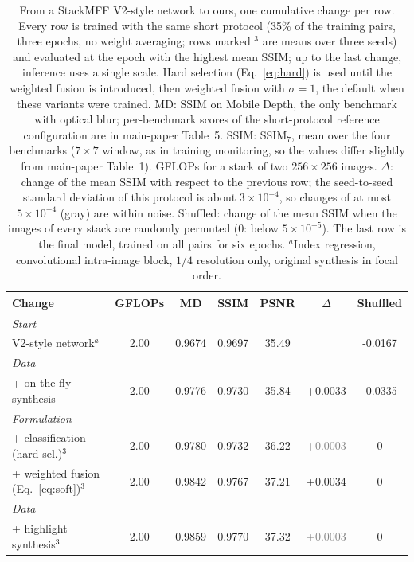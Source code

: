 \begin{table}[htbp]
\centering
\scriptsize
\setlength{\tabcolsep}{3pt}
\caption{From a StackMFF V2-style network to ours, one cumulative change per row. Every row is trained with the same short protocol (35\% of the training pairs, three epochs, no weight averaging; rows marked $^{3}$ are means over three seeds) and evaluated at the epoch with the highest mean SSIM; up to the last change, inference uses a single scale. Hard selection (Eq.~\eqref{eq:hard}) is used until the weighted fusion is introduced, then weighted fusion with $\sigma=1$, the default when these variants were trained. MD: SSIM on Mobile Depth, the only benchmark with optical blur; per-benchmark scores of the short-protocol reference configuration are in main-paper Table~5. SSIM: SSIM$_7$, mean over the four benchmarks ($7\times7$ window, as in training monitoring, so the values differ slightly from main-paper Table~1). GFLOPs for a stack of two $256\times256$ images. $\Delta$: change of the mean SSIM with respect to the previous row; the seed-to-seed standard deviation of this protocol is about $3\times10^{-4}$, so changes of at most $5\times10^{-4}$ (gray) are within noise. Shuffled: change of the mean SSIM when the images of every stack are randomly permuted ($0$: below $5\times10^{-5}$). The last row is the final model, trained on all pairs for six epochs. $^{a}$Index regression, convolutional intra-image block, $1/4$ resolution only, original synthesis in focal order.}
\label{tab:roadmap}
\begin{tabular}{lcccccc}
\toprule
Change & GFLOPs & MD & SSIM & PSNR & $\Delta$ & Shuffled \\
\midrule
\multicolumn{7}{l}{\textit{Start}} \\
V2-style network$^{a}$ & 2.00 & 0.9674 & 0.9697 & 35.49 &  & -0.0167 \\
\multicolumn{7}{l}{\textit{Data}} \\
+ on-the-fly synthesis & 2.00 & 0.9776 & 0.9730 & 35.84 & +0.0033 & -0.0335 \\
\multicolumn{7}{l}{\textit{Formulation}} \\
+ classification (hard sel.)$^{3}$ & 2.00 & 0.9780 & 0.9732 & 36.22 & \textcolor{gray}{+0.0003} & $0$ \\
+ weighted fusion (Eq.~\eqref{eq:soft})$^{3}$ & 2.00 & 0.9842 & 0.9767 & 37.21 & +0.0034 & $0$ \\
\multicolumn{7}{l}{\textit{Data}} \\
+ highlight synthesis$^{3}$ & 2.00 & 0.9859 & 0.9770 & 37.32 & \textcolor{gray}{+0.0003} & $0$ \\

\end{tabular}
\end{table}
